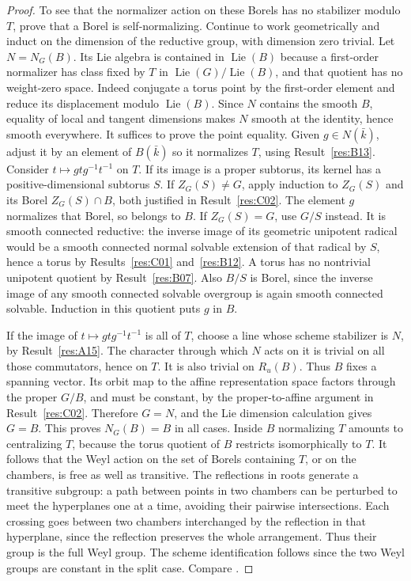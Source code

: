\documentclass[11pt,a4paper,openany,oneside]{book}
\theoremstyle{resultstyle}
\theoremstyle{definition}
\numberwithin{equation}{chapter}
\DeclareMathOperator{\Lie}{Lie}
\begin{document}
\begin{proof}
To see that the normalizer action on these Borels has no
stabilizer modulo \(T\), prove that a Borel is self-normalizing.
Continue to work geometrically and induct on the dimension
of the reductive group, with dimension zero trivial.
Let \(N=N_G(B)\). Its Lie algebra is contained in
\(\Lie(B)\) because a first-order normalizer has class
fixed by \(T\) in \(\Lie(G)/\Lie(B)\), and that
quotient has no weight-zero space. Indeed conjugate a
torus point by the first-order element and reduce its
displacement modulo \(\Lie(B)\). Since \(N\) contains the
smooth \(B\), equality of local and tangent dimensions
makes \(N\) smooth at the identity, hence smooth everywhere.
It suffices to prove the point equality. Given \(g\in N(\bar k)\),
adjust it by an element of \(B(\bar k)\) so it normalizes \(T\),
using Result~\ref{res:B13}. Consider \(t\mapsto gtg^{-1}t^{-1}\)
on \(T\). If its image is a proper subtorus, its kernel has a
positive-dimensional subtorus \(S\). If \(Z_G(S)\ne G\),
apply induction to \(Z_G(S)\) and its Borel \(Z_G(S)\cap B\),
both justified in Result~\ref{res:C02}. The element \(g\)
normalizes that Borel, so belongs to \(B\). If \(Z_G(S)=G\),
use \(G/S\) instead. It is smooth connected reductive:
the inverse image of its geometric unipotent radical would be
a smooth connected normal solvable extension of that radical
by \(S\), hence a torus by Results~\ref{res:C01}
and~\ref{res:B12}. A torus has no nontrivial unipotent
quotient by Result~\ref{res:B07}. Also \(B/S\) is Borel,
since the inverse image of any smooth connected solvable
overgroup is again smooth connected solvable.
Induction in this quotient puts \(g\) in \(B\).

If the image of \(t\mapsto gtg^{-1}t^{-1}\) is all of \(T\),
choose a line whose scheme stabilizer is \(N\), by
Result~\ref{res:A15}. The character through which \(N\)
acts on it is trivial on all those commutators, hence on \(T\).
It is also trivial on \(R_u(B)\). Thus \(B\) fixes a
spanning vector. Its orbit map to the affine representation
space factors through the proper \(G/B\), and must be
constant, by the proper-to-affine argument in
Result~\ref{res:C02}. Therefore \(G=N\), and the Lie dimension
calculation gives \(G=B\). This proves \(N_G(B)=B\)
in all cases. Inside \(B\) normalizing \(T\) amounts
to centralizing \(T\), because the torus quotient of \(B\)
restricts isomorphically to \(T\).
It follows that the Weyl action on the set of Borels containing
\(T\), or on the chambers, is free as well as transitive.
The reflections in roots generate a transitive subgroup:
a path between points in two chambers can be perturbed to
meet the hyperplanes one at a time, avoiding their pairwise
intersections. Each crossing goes between two chambers
interchanged by the reflection in that hyperplane, since the
reflection preserves the whole arrangement. Thus their group
is the full Weyl group. The scheme identification follows
since the two Weyl groups are constant in the split case.
Compare \cite[Sections 17.e and 21.d]{milne}.


\end{proof}
\end{document}
